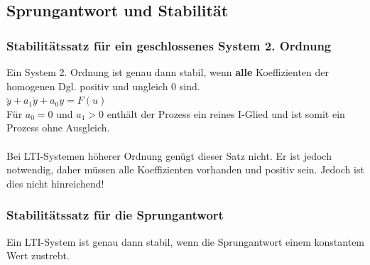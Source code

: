 			
	\subsection{Sprungantwort und Stabilität }
		\subsubsection{Stabilitätssatz für ein geschlossenes System 2. Ordnung }
			Ein System 2. Ordnung ist genau dann stabil, wenn {\bf alle} Koeffizienten der
			homogenen Dgl. positiv und ungleich 0 sind.\\
			$\ddot{y}+a_1\dot{y}+a_0y=F(u)$ \\
			Für $a_0 = 0$ und $a_1 > 0$ enthält der Prozess ein reines I-Glied und
			ist somit ein Prozess ohne Ausgleich.  \\ \\
			Bei LTI-Systemen höherer Ordnung genügt dieser Satz nicht. Er ist jedoch notwendig, daher müssen alle Koeffizienten vorhanden und positiv sein. Jedoch ist dies nicht hinreichend!
			
		\subsubsection{Stabilitätssatz für die Sprungantwort}
			Ein LTI-System ist genau dann stabil, wenn die Sprungantwort einem
			konstantem Wert zustrebt.
